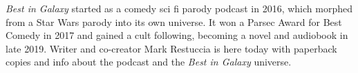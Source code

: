 \textit{Best in Galaxy} started as a comedy sci fi parody podcast in 2016,
which morphed from a Star Wars parody into its own universe. It won a
Parsec Award for Best Comedy in 2017 and gained a cult following,
becoming a novel and audiobook in late 2019. Writer and co-creator
Mark Restuccia is here today with paperback copies and info about the
podcast and the \textit{Best in Galaxy} universe.
